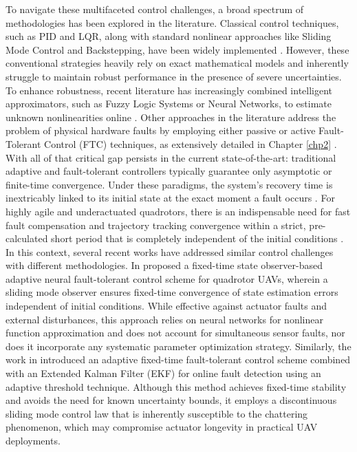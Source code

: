 To navigate these multifaceted control challenges, a broad spectrum of methodologies has been explored in the literature. Classical control techniques, such as PID and LQR, along with standard nonlinear approaches like Sliding Mode Control and Backstepping, have been widely implemented \cite{PID1, lqr1, glida2020dobsc, glida2019fabsc, guettal2020chebsmc}. However, these conventional strategies heavily rely on exact mathematical models and inherently struggle to maintain robust performance in the presence of severe uncertainties. To enhance robustness, recent literature has increasingly combined intelligent approximators, such as Fuzzy Logic Systems or Neural Networks, to estimate unknown nonlinearities online \cite{fls, glida2019bat, guettal2020fnnbsc, PID_LQR_Ref, glida2021mffl}. Other approaches in the literature address the problem of physical hardware faults by employing either passive or active Fault-Tolerant Control (FTC) techniques, as extensively detailed in Chapter \ref{chp2} \cite{ftc_UAV_review1, Passive_Ref, Active_Ref, glida2024tiv}. With all of that critical gap persists in the current state-of-the-art: traditional adaptive and fault-tolerant controllers typically guarantee only asymptotic or finite-time convergence. Under these paradigms, the system's recovery time is inextricably linked to its initial state at the exact moment a fault occurs \cite{Bhat2000}. For highly agile and underactuated quadrotors, there is an indispensable need for fast fault compensation and trajectory tracking convergence within a strict, pre-calculated short period that is completely independent of the initial conditions \cite{fxt, Zuo2018}. In this context, several recent works have addressed similar control challenges with different methodologies. In \cite{ranjan2025} proposed a fixed-time state observer-based adaptive neural fault-tolerant control scheme for quadrotor UAVs, wherein a sliding mode observer ensures fixed-time convergence of state estimation errors independent of initial conditions. While effective against actuator faults and external disturbances, this approach relies on neural networks for nonlinear function approximation and does not account for simultaneous sensor faults, nor does it incorporate any systematic parameter optimization strategy. Similarly, the work in\cite{robust_ftc_2024} introduced an adaptive fixed-time fault-tolerant control scheme combined with an Extended Kalman Filter (EKF) for online fault detection using an adaptive threshold technique. Although this method achieves fixed-time stability and avoids the need for known uncertainty bounds, it employs a discontinuous sliding mode control law that is inherently susceptible to the chattering phenomenon, which may compromise actuator longevity in practical UAV deployments. 

